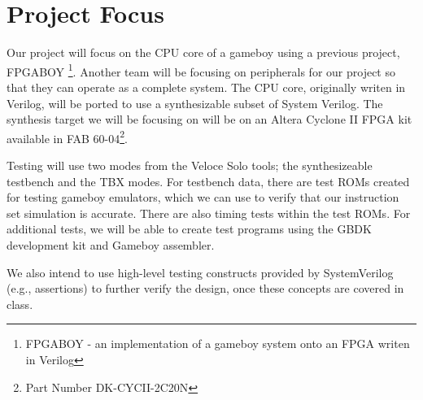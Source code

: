 \section{Project Focus}
Our project will focus on the CPU core of a gameboy using a previous project,
FPGABOY \footnote{FPGABOY - an implementation of a gameboy system onto an FPGA 
writen in Verilog}. Another team will be focusing on peripherals for our project 
so that they can operate as a complete system. The CPU core, originally writen 
in Verilog, will be ported to use a synthesizable subset of System Verilog.
The synthesis target we will be focusing on will be on an Altera Cyclone II 
FPGA kit available in FAB 60-04\footnote{Part Number DK-CYCII-2C20N}.

Testing will use two modes from the Veloce Solo tools; the synthesizeable 
testbench and the TBX modes. For testbench data, there are test ROMs created 
for testing gameboy emulators, which we can use to verify that our instruction 
set simulation is accurate. There are also timing tests within the test ROMs. For additional tests, we will be able to create test programs using the GBDK development kit and Gameboy assembler.

We also intend to use high-level testing constructs provided by SystemVerilog (e.g., assertions) to further verify the design, once these concepts are covered in class. 
